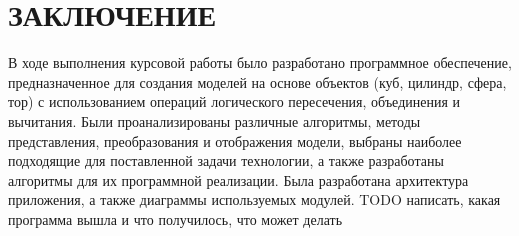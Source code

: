 \section*{ЗАКЛЮЧЕНИЕ}
В  ходе  выполнения  курсовой работы  было  разработано  программное обеспечение, предназначенное для создания моделей на основе объектов (куб, цилиндр, сфера, тор) с использованием операций логического пересечения, объединения и 
вычитания.  
Были  проанализированы  различные  алгоритмы,  методы  представления, 
преобразования  и  отображения  модели,  выбраны  наиболее  подходящие  для поставленной  задачи  технологии,  а  также  разработаны  алгоритмы  для  их 
программной реализации. 
Была разработана архитектура приложения, а также 
диаграммы используемых модулей. 
TODO написать, какая программа вышла и что получилось, что может делать
\pagebreak